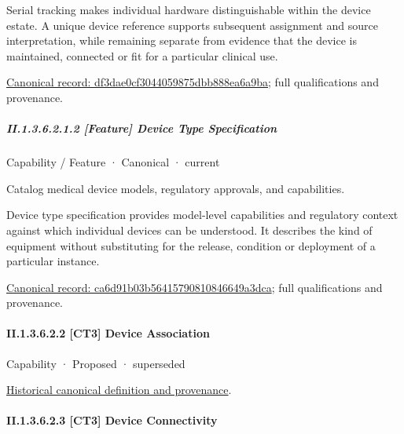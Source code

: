 Serial tracking makes individual hardware distinguishable within the device estate. A unique device reference supports subsequent assignment and source interpretation, while remaining separate from evidence that the device is maintained, connected or fit for a particular clinical use.


{\footnotesize \href{../../../../continuum/strategy/capability/feature/df3dae0cf3044059875dbb888ea6a9ba.md}{Canonical record: df3dae0cf3044059875dbb888ea6a9ba}; full qualifications and provenance.}\par
\subparagraph*{II.1.3.6.2.1.2 [Feature] Device Type Specification}
\label{navigation:II.1.3.6.2.1.2}

\label{element:ca6d91b03b56415790810846649a3dca}
{\small Capability / Feature · Canonical · current}\par

Catalog medical device models, regulatory approvals, and capabilities.



Device type specification provides model-level capabilities and regulatory context against which individual devices can be understood. It describes the kind of equipment without substituting for the release, condition or deployment of a particular instance.


{\footnotesize \href{../../../../continuum/strategy/capability/feature/ca6d91b03b56415790810846649a3dca.md}{Canonical record: ca6d91b03b56415790810846649a3dca}; full qualifications and provenance.}\par
\paragraph*{II.1.3.6.2.2 [CT3] Device Association}
\label{navigation:II.1.3.6.2.2}

\label{element:902daf2ce9714876bbfee52eef1a7ab0}
{\small Capability · Proposed · superseded}\par
\href{../../../../continuum/strategy/capability/902daf2ce9714876bbfee52eef1a7ab0.md}{Historical canonical definition and provenance}.\par
\paragraph*{II.1.3.6.2.3 [CT3] Device Connectivity}
\label{navigation:II.1.3.6.2.3}

